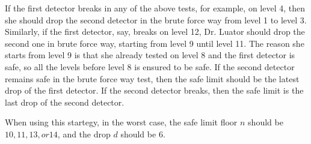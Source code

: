 \documentclass[11pt]{article}
\begin{document}
If the first detector breaks in any of the above tests, for example, on level 4,
then she should drop the second detector in the brute force way from level 1 to level 3.
Similarly, if the first detector, say, breaks on level 12, Dr. Luator should drop the second one
in brute force way, starting from level 9 until level 11. The reason she starts from level 9 is
that she already tested on level 8 and the first detector is safe, so all the levels before level 8
is ensured to be safe. If the second detector remains safe in the brute force way test,
then the safe limit should be the latest drop of the first detector.
If the second detector breaks, then the safe limit is the last drop of the second detector.

When using this startegy, in the worst case, the safe
limit floor $n$ should be $10, 11, 13, or 14$, and the drop $d$ should be $6$.

\end{document}
